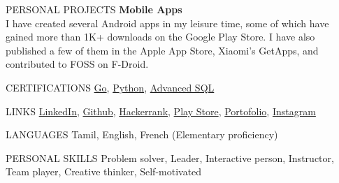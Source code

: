 \documentclass{template}
\begin{document}
\begin{rSection}{PERSONAL PROJECTS}
\textbf{Mobile Apps} \\
I have created several Android apps in my leisure time, some of which have gained more than 1K+ downloads on the Google Play Store. I have also published a few of them in the Apple App Store, Xiaomi's GetApps, and contributed to FOSS on F-Droid.
\end{rSection}

\begin{rSection}{CERTIFICATIONS}
\href{https://www.hackerrank.com/certificates/7a93b8463217}{Go},
\href{https://www.hackerrank.com/certificates/1ba30bc9d411}{Python},
\href{https://www.hackerrank.com/certificates/271a02a6623d}{Advanced SQL}
\end{rSection}

\begin{rSection}{LINKS}
\href{https://www.linkedin.com/in/sanjivy-kumaravel-1bb99a173}{LinkedIn},
\href{https://github.com/princesanjivy}{Github},
\href{https://www.hackerrank.com/profile/sanjivy_android}{Hackerrank},
\href{https://play.google.com/store/apps/dev?id=6439925551269057866}{Play Store},
\href{https://princesanjivy-portfolio.web.app/}{Portofolio},
\href{https://www.instagram.com/princesanjivy}{Instagram}
\end{rSection}

\begin{rSection}{LANGUAGES}
Tamil, English, French (Elementary proficiency)
\end{rSection}

\begin{rSection}{PERSONAL SKILLS}
Problem solver, Leader, Interactive person, Instructor, Team player, Creative thinker, Self-motivated
\end{rSection}
\end{document}
